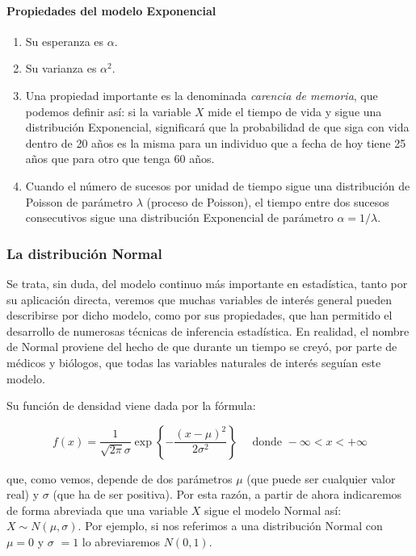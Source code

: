 \documentclass[
]{article}
\begin{document}
\paragraph{Propiedades del modelo Exponencial}\label{propiedades-del-modelo-exponencial}

\begin{enumerate}
\def\labelenumi{\arabic{enumi}.}
\item
  Su esperanza es \(\alpha\).
\item
  Su varianza es \(\alpha^{2}\).
\item
  Una propiedad importante es la denominada \emph{carencia de memoria}, que podemos definir así: si la variable \(X\) mide el tiempo de vida y sigue una distribución Exponencial, significará que la probabilidad de que siga con vida dentro de 20 años es la misma para un individuo que a fecha de hoy tiene 25 años que para otro que tenga 60 años.
\item
  Cuando el número de sucesos por unidad de tiempo sigue una distribución de Poisson de parámetro \(\lambda\) (proceso de Poisson), el tiempo entre dos sucesos consecutivos sigue una distribución Exponencial de parámetro \(\alpha=1 / \lambda\).
\end{enumerate}

\subsubsection{La distribución Normal}\label{la-distribuciuxf3n-normal}

Se trata, sin duda, del modelo continuo más importante en estadística, tanto por su aplicación directa, veremos que muchas variables de interés general pueden describirse por dicho modelo, como por sus propiedades, que han permitido el desarrollo de numerosas técnicas de inferencia estadística. En realidad, el nombre de Normal proviene del hecho de que durante un tiempo se creyó, por parte de médicos y biólogos, que todas las variables naturales de interés seguían este modelo.

Su función de densidad viene dada por la fórmula:

\[
f(x)=\frac{1}{\sqrt{2 \pi} \sigma} \exp \left\{-\frac{(x-\mu)^{2}}{2 \sigma^{2}}\right\} \quad \text { donde }-\infty<x<+\infty
\]

que, como vemos, depende de dos parámetros \(\mu\) (que puede ser cualquier valor real) y \(\sigma\) (que ha de ser positiva). Por esta razón, a partir de ahora indicaremos de forma abreviada que una variable \(X\) sigue el modelo Normal así: \(X \sim N(\mu, \sigma)\). Por ejemplo, si nos referimos a una distribución Normal con \(\mu=0\) y \(\sigma\) \(=1\) lo abreviaremos \(N(0,1)\).
\end{document}
